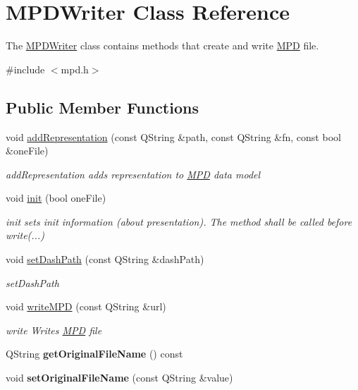 \hypertarget{class_m_p_d_writer}{\section{M\-P\-D\-Writer Class Reference}
\label{class_m_p_d_writer}
}


The \hyperlink{class_m_p_d_writer}{M\-P\-D\-Writer} class contains methods that create and write \hyperlink{class_m_p_d}{M\-P\-D} file.  




{\ttfamily \#include $<$mpd.\-h$>$}

\subsection*{Public Member Functions}
\begin{DoxyCompactItemize}
\item 
void \hyperlink{class_m_p_d_writer_a6e014465e66d27b34efc52ae6c32fdd9}{add\-Representation} (const Q\-String \&path, const Q\-String \&fn, const bool \&one\-File)
\begin{DoxyCompactList}\small\item\em add\-Representation adds representation to \hyperlink{class_m_p_d}{M\-P\-D} data model \end{DoxyCompactList}\item 
void \hyperlink{class_m_p_d_writer_a5aa7772d432aab1eb501fb20f3a1d0af}{init} (bool one\-File)
\begin{DoxyCompactList}\small\item\em init sets init information (about presentation). The method shall be called before write(...) \end{DoxyCompactList}\item 
void \hyperlink{class_m_p_d_writer_a4d1fb1b9b816050498f54642b3fac073}{set\-Dash\-Path} (const Q\-String \&dash\-Path)
\begin{DoxyCompactList}\small\item\em set\-Dash\-Path \end{DoxyCompactList}\item 
void \hyperlink{class_m_p_d_writer_a366910941d11fd2094b746d91ab00732}{write\-M\-P\-D} (const Q\-String \&url)
\begin{DoxyCompactList}\small\item\em write Writes \hyperlink{class_m_p_d}{M\-P\-D} file \end{DoxyCompactList}\item 
\hypertarget{class_m_p_d_writer_a71368fe4d1badbec026e800ba33c846d}{Q\-String {\bfseries get\-Original\-File\-Name} () const }\label{class_m_p_d_writer_a71368fe4d1badbec026e800ba33c846d}

\item 
\hypertarget{class_m_p_d_writer_abdf037e38bd1d3ea0eb29d901212d78e}{void {\bfseries set\-Original\-File\-Name} (const Q\-String \&value)}\label{class_m_p_d_writer_abdf037e38bd1d3ea0eb29d901212d78e}

\end{DoxyCompactItemize}


